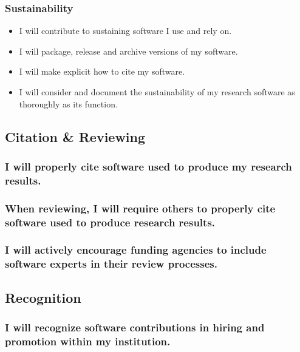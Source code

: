 \documentclass[a4paper,UKenglish]{dagman}
\renewcommand{\paragraph}[1]{\subsubsection*{#1}\xspace}
\begin{document}
\paragraph{Sustainability}
\begin{itemize}
\item I will contribute to sustaining software I use and rely on. 
\item I will package, release and archive versions of my software.
\item I will make explicit how to cite my software.
\item I will consider and document the sustainability of my research software as thoroughly as its function.
\end{itemize}





\subsection{Citation \& Reviewing}

\paragraph{I will properly cite software used to produce my research results.}

\paragraph{When reviewing, I will require others to properly cite software used to produce research results.}

\paragraph{I will actively encourage funding agencies to include software experts in their review processes.}


\subsection{Recognition}

\paragraph{I will recognize software contributions in hiring and promotion within my institution.}
\end{document}
